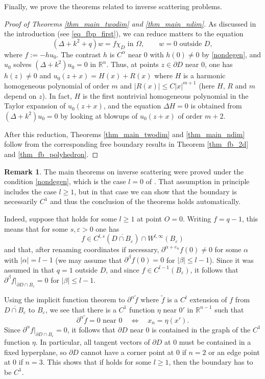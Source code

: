 \documentclass[11pt,a4paper]{amsart}
\theoremstyle{definition}
\newtheorem{Remark}[Theorem]{Remark}
\numberwithin{equation}{section}
\newcommand{\mR}{\mathbb{R}}                    %
\newcommand{\ol}[1]{\overline{#1}}
\newcommand{\eps}{\varepsilon}
\newcommand{\p}{\partial}
\begin{document}
Finally, we prove the theorems related to inverse scattering problems.

\begin{proof}[Proof of Theorems \ref{thm_main_twodim} and \ref{thm_main_ndim}]
As discussed in the introduction (see \eqref{eq_fbp_first}), we can reduce matters to the equation 
\[
(\Delta+k^2+q)w = f \chi_D \text{ in $\Omega$}, \qquad w = 0 \text{ outside $D$},
\]
where $f := -h u_0$. The contrast $h$ is $C^{\alpha}$ near $0$ with $h(0) \neq 0$ by \eqref{nondegen}, and $u_0$ solves $(\Delta+k^2) u_0 = 0$ in $\mR^n$. Thus, at points $z \in \p D$ near $0$, one has $h(z) \neq 0$ and $u_0(z+x) = H(x) + R(x)$ where $H$ is a harmonic homogeneous polynomial of order $m$ and $|R(x)| \leq C|x|^{m+1}$ (here $H$, $R$ and $m$ depend on $z$). In fact, $H$ is the first nontrivial homogeneous polynomial in the Taylor expansion of $u_0(z+x)$, and the equation $\Delta H = 0$ is obtained from $(\Delta+k^2)u_0 = 0$ by looking at blowups of $u_0(z+x)$ of order $m+2$.

After this reduction, Theorems \ref{thm_main_twodim} and \ref{thm_main_ndim} follow from the corresponding free boundary results in Theorem \ref{thm_fb_2d} and \ref{thm_fb_polyhedron}.
\end{proof}

\begin{Remark} \label{rem_eh_assumption}
The main theorems on inverse scattering were proved under the condition \eqref{nondegen}, which is the case $l = 0$ of \cite[Assumption (a)]{ElschnerHu2}. That assumption in principle includes the case $l \geq 1$, but in that case we can show that the boundary is necessarily $C^1$ and thus the conclusion of the theorems holds automatically.

Indeed, suppose that \cite[Assumption (a)]{ElschnerHu2} holds for some $l \geq 1$ at point $O = 0$. Writing $f = q-1$, this means that for some $s, \eps > 0$ one has 
\[
f \in C^{l,s}(\ol{D \cap B_{\eps}}) \cap W^{l,\infty}(B_{\eps})
\]
and that, after renaming coordinates if necessary, $\p^{\alpha+e_n} f(0) \neq 0$ for some $\alpha$ with $|\alpha|=l-1$ (we may assume that $\p^{\beta} f(0) = 0$ for $|\beta| \leq l-1$). Since it was assumed in \cite{ElschnerHu2} that $q=1$ outside $D$, and since $f \in C^{l-1}(B_{\eps})$, it follows that $\p^{\beta} f|_{\p D \cap B_{\eps}} = 0$ for $|\beta| \leq l-1$.


Using the implicit function theorem to $\p^{\alpha} \tilde{f}$ where $\tilde{f}$ is a $C^{l}$ extension of $f$ from $\ol{D \cap B_{\eps}}$ to $B_{\eps}$, we see that there is a $C^1$ function $\eta$ near $0'$ in $\mR^{n-1}$ such that 
\[
\p^{\alpha} \tilde{f} = 0 \text{ near $0$} \quad \Longleftrightarrow \quad x_n = \eta(x').
\]
Since $\p^{\alpha} f|_{\p D \cap B_{\eps}} = 0$, it follows that $\p D$ near $0$ is contained in the graph of the $C^1$ function $\eta$. In particular, all tangent vectors of $\p D$ at $0$ must be contained in a fixed hyperplane, so $\p D$ cannot have a corner point at $0$ if $n=2$ or an edge point at $0$ if $n=3$. This shows that if \cite[Assumption (a)]{ElschnerHu2} holds for some $l \geq 1$, then the boundary has to be $C^1$.
\end{Remark}
\end{document}
